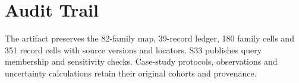 \section{Audit Trail}\label{app:audit-trail}
The artifact preserves the 82-family map, 39-record ledger, 180 family cells and 351 record cells with source versions and locators. S33 publishes query membership and sensitivity checks. Case-study protocols, observations and uncertainty calculations retain their original cohorts and provenance.
